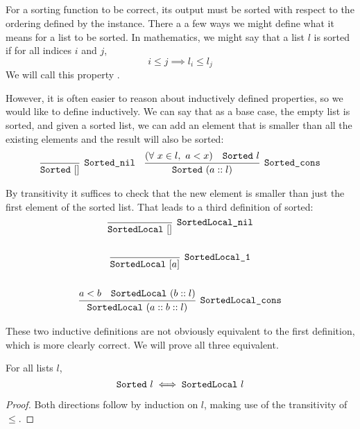 \documentclass[sigplan,10pt,anonymous,review]{thesis}
\begin{document}
\subsection{}
\label{subsec:sorted}

For a sorting function to be correct, its output must be sorted with
respect to the ordering defined by the  instance. There a
a few ways we might define what it means for a list to be sorted. In
mathematics, we might say that a list $l$ is sorted if for all indices
$i$ and $j$,
\begin{equation*}
  i \le j \implies l_i \le l_j
\end{equation*}
We will call this property .

However, it is often easier to reason about inductively defined
properties, so we would like to define  inductively. We
can say that as a base case, the empty list is sorted, and given a
sorted list, we can add an element that is smaller than all the
existing elements and the result will also be sorted:
\begin{align*}
  \infer[\var{Sorted\_nil}]{\var{Sorted}~[]}{}
  &&
  \infer[\var{Sorted\_cons}]{\var{Sorted}~(a :: l)}{%
    (\forall~x \in l,~a < x) & \var{Sorted}~l
  }
\end{align*}

By transitivity it suffices to check that the new element is
smaller than just the first element of the sorted list. That leads to a third definition of sorted:
\begin{gather*}
  \infer[\var{SortedLocal\_nil}]{\var{SortedLocal}~[]}{}
  \\
  \\
  \infer[\var{SortedLocal\_1}]{\var{SortedLocal}~[a]}{}
  \\
  \\
  \infer[\var{SortedLocal\_cons}]{\var{SortedLocal}~(a :: b :: l)}{%
    a < b & \var{SortedLocal}~(b :: l)
  }
\end{gather*}

These two inductive definitions are not obviously equivalent to the
first definition, which is more clearly correct. We will prove all
three equivalent.

\begin{theorem}
  For all lists $l$,
  \begin{equation*}
    \texttt{\textup{Sorted}}~l \iff \texttt{\textup{SortedLocal}}~l
  \end{equation*}
\end{theorem}
\begin{proof}
  Both directions follow by induction on $l$, making use of the
  transitivity of $\le$.
\end{proof}
\end{document}
